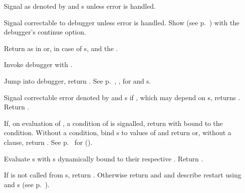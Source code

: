 \begin{LIST}{1cm}
  {
  Signal  as denoted by  and s unless
  error is handled. 
  }

  {
  Signal correctable  to debugger unless error is
  handled. Show   (see
  p.\ \pageref{section:Format}) with the debugger's continue option.
  }

  {
  Return  as in  or, in case of s,
  \retval{\NIL} and the .
  }

  {
  Invoke debugger with .
  }

  {
  Jump into debugger, return \retval{\NIL}.
  See p.\ \pageref{section:Format}, , for 
  and s. 
  }

  {
  Signal correctable error denoted by  and s if
  , which may depend on s, returns \NIL. Return
  \retval{\NIL}. 
  }

  {
  If, on evaluation of , a condition of  is
  signalled, return 
  with  bound to the condition. Without a condition, bind
  s to values of  and return  or, without a  clause, return
  . See p.\ \pageref{section:Functions}
  for ().
  }

  {
  Evaluate s with s dynamically bound to
  their respective . Return .
  }

  {
  If  is not called from s, return
  . Otherwise return \retval{\NIL}
  and \retvalii{\T} and describe restart using  
  and s (see p.\ \pageref{section:Format}).
  }


\end{LIST}
